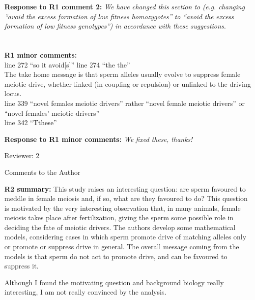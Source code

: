 \documentclass[12pt,letterpaper]{article}
\begin{document}
{\bf{Response to R1 comment 2:}} \emph{We have changed this section to (e.g. changing ``avoid the excess formation of low fitness homozygotes'' to ``avoid the excess formation of low fitness genotypes'') in accordance with these suggestions.}
\\
\\
\\
{\bf{R1 minor comments:}}
\\ line 272 ``so it avoid[s]'' line 274 ``the the''
\\
The take home message is that sperm alleles usually evolve to suppress female meiotic drive, whether linked (in coupling or repulsion) or unlinked to the driving locus.
\\
line 339 ``novel females meiotic drivers'' rather ``novel female meiotic drivers'' or ``novel females' meiotic drivers''
\\
line 342 ``Tthese''

{\bf{Response to R1 minor comments:}} \emph{We fixed these, thanks!}

\newpage{}

Reviewer: 2

Comments to the Author

{\bf{R2 summary:}}
This study raises an interesting question: are sperm favoured to meddle in female meiosis and, if so, what are they favoured to do? This question is motivated by the very interesting observation that, in many animals, female meiosis takes place after fertilization, giving the sperm some possible role in deciding the fate of meiotic drivers. The authors develop some mathematical models, considering cases in which sperm promote drive of matching alleles only or promote or suppress drive in general. The overall message coming from the models is that sperm do not act to promote drive, and can be favoured to suppress it.

Although I found the motivating question and background biology really interesting, I am not really convinced by the analysis.
\end{document}
